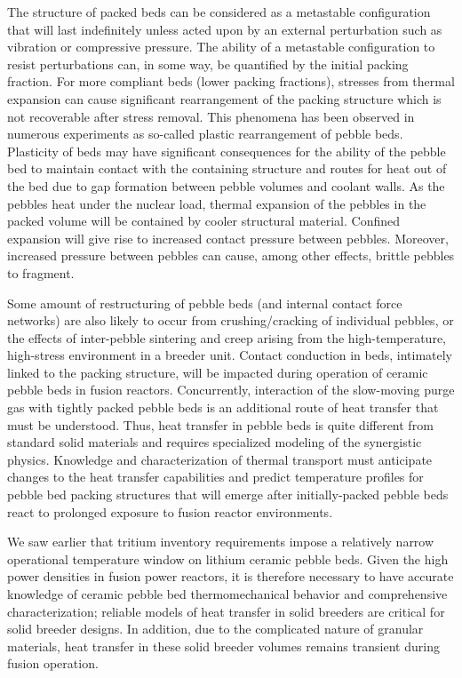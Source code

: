 \documentclass[11pt]{report} %
\begin{document}
The structure of packed beds can be considered as a metastable configuration that will last indefinitely unless acted upon by an external perturbation such as vibration or compressive pressure.\cite{Jaeger1996} The ability of a metastable configuration to resist perturbations can, in some way, be quantified by the initial packing fraction. For more compliant beds (lower packing fractions), stresses from thermal expansion can cause significant rearrangement of the packing structure which is not recoverable after stress removal. This phenomena has been observed in numerous experiments as so-called plastic rearrangement of pebble beds.\cite{Reimann:2002kl,Reimann:2000tw,Zhang2015} Plasticity of beds may have significant consequences for the ability of the pebble bed to maintain contact with the containing structure and routes for heat out of the bed due to gap formation between pebble volumes and coolant walls. As the pebbles heat under the nuclear load, thermal expansion of the pebbles in the packed volume will be contained by cooler structural material. Confined expansion will give rise to increased contact pressure between pebbles. Moreover, increased pressure between pebbles can cause, among other effects, brittle pebbles to fragment.

Some amount of restructuring of pebble beds (and internal contact force networks) are also likely to occur from crushing/cracking of individual pebbles, or the effects of inter-pebble sintering and creep arising from the high-temperature, high-stress environment in a breeder unit. Contact conduction in beds, intimately linked to the packing structure, will be impacted during operation of ceramic pebble beds in fusion reactors. Concurrently, interaction of the slow-moving purge gas with tightly packed pebble beds is an additional route of heat transfer that must be understood. Thus, heat transfer in pebble beds is quite different from standard solid materials and requires specialized modeling of the synergistic physics. Knowledge and characterization of thermal transport must anticipate changes to the heat transfer capabilities and predict temperature profiles for pebble bed packing structures that will emerge after initially-packed pebble beds react to prolonged exposure to fusion reactor environments.

We saw earlier that tritium inventory requirements impose a relatively narrow operational temperature window on lithium ceramic pebble beds. Given the high power densities in fusion power reactors, it is therefore necessary to have accurate knowledge of ceramic pebble bed thermomechanical behavior and comprehensive characterization; reliable models of heat transfer in solid breeders are critical for solid breeder designs. In addition, due to the complicated nature of granular materials, heat transfer in these solid breeder volumes remains transient during fusion operation. 
\end{document}

